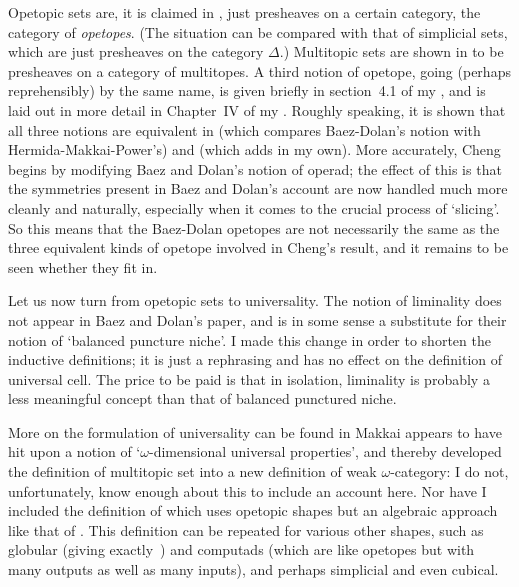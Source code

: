 Opetopic sets are, it is claimed in , just presheaves on a
certain category, the category of \emph{opetopes}.  (The situation can be
compared with that of simplicial sets, which are just presheaves on the
category $\Delta$.)  Multitopic sets are shown in  to be
presheaves on a category of multitopes.  A third notion of opetope, going
(perhaps reprehensibly) by the same name, is given briefly in section~4.1 of
my , and is laid out in more detail in Chapter~IV of my
.  Roughly speaking, it is shown that all three notions are
equivalent in
% 
%
% 
(which compares Baez-Dolan's notion with Hermida-Makkai-Power's) and
% 
%
% 
(which adds in my own).  More accurately, Cheng begins  by
modifying Baez and Dolan's notion of operad; the effect of this is that the
symmetries present in Baez and Dolan's account are now handled much more
cleanly and naturally, especially when it comes to the crucial process of
`slicing'.  So this means that the Baez-Dolan opetopes are not necessarily
the same as the three equivalent kinds of opetope involved in Cheng's
result, and it remains to be seen whether they fit in.

Let us now turn from opetopic sets to universality.  The notion of liminality
does not appear in Baez and Dolan's paper, and is in some sense a substitute
for their notion of `balanced puncture niche'.  I made this change in order
to shorten the inductive definitions; it is just a rephrasing and has no
effect on the definition of universal cell.  The price to
be paid is that in isolation, liminality is probably a less meaningful
concept than that of balanced punctured niche.  

More on the formulation of universality can be found in
% 
%
% 
Makkai appears to have hit upon a notion of `$\omega$-dimensional
universal properties', and thereby developed the definition of multitopic set
into a new definition of weak $\omega$-category:
% 
%
% 
I do not, unfortunately, know enough about this to include an account here.
Nor have I included the definition of
% 
%
% 
which uses opetopic shapes but an algebraic approach like that of .
This definition can be repeated for various other shapes, such as globular
(giving exactly~) and computads (which are like opetopes but with many
outputs as well as many inputs), and perhaps simplicial and even cubical.


